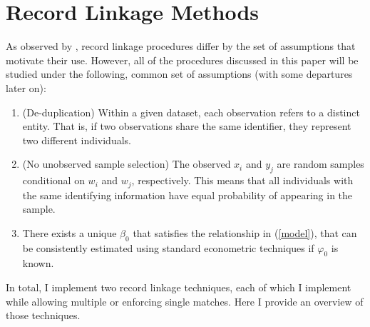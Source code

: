 \documentclass[12pt]{article}
\begin{document}


\section{Record Linkage Methods}



As observed by \cite{bailey2017}, record linkage procedures differ by the set of assumptions that motivate their use.  However, all of the procedures discussed in this paper will be studied under the following, common set of assumptions (with some departures later on):
\begin{enumerate}
\item (De-duplication) Within a given dataset, each observation refers to a distinct entity.  That is, if two observations share the same identifier, they represent two different individuals.
\item (No unobserved sample selection) The observed $x_i$ and $y_j$ are random samples conditional on $w_i$ and $w_j$, respectively.  This means that all individuals with the same identifying information have equal probability of appearing in the sample. 
\item There exists a unique $\beta_0$ that satisfies the relationship in (\ref{model}), that can be consistently estimated using standard econometric techniques if $\varphi_0$ is known.
\end{enumerate}

In total, I implement two record linkage techniques, each of which I implement while allowing multiple or enforcing single matches.  Here I provide an overview of those techniques. 
\end{document}
